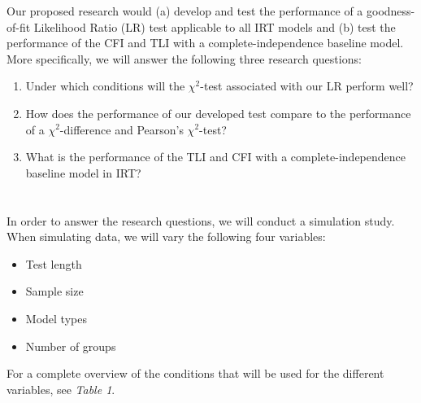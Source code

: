 \documentclass{article}
\begin{document}
\indent Our proposed research would (a) develop and test the performance of a goodness-of-fit Likelihood Ratio (LR) test applicable to all IRT models and (b) test the performance of the CFI and TLI with a complete-independence baseline model. More specifically, we will answer the following three research questions:
\begin{enumerate}
\item Under which conditions will the $\chi^2$-test associated with our LR perform well?
\item How does the performance of our developed test compare to the performance of a $\chi^2$-difference and Pearson's $\chi^2$-test?
\item What is the performance of the TLI and CFI with a complete-independence baseline model in IRT?
\end{enumerate}

\section{}
In order to answer the research questions, we will conduct a simulation study. When simulating data, we will vary the following four variables:

\begin{itemize}
\item Test length
\item Sample size
\item Model types
\item Number of groups
\end{itemize}

\noindent For a complete overview of the conditions that will be used for the different variables, see \textit{Table 1}. \newpage
\end{document}
